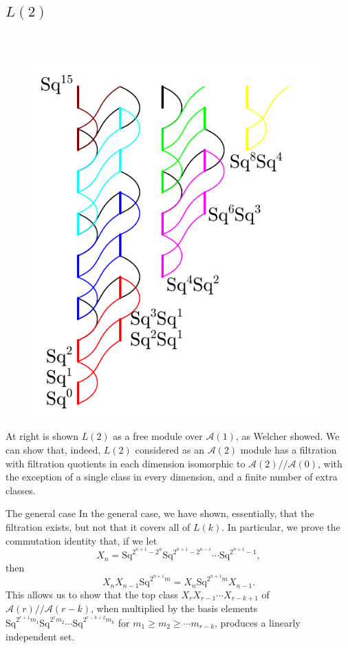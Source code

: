 \documentclass[final]{beamer}
\newcommand{\A}{\mathcal{A}}
\newcommand{\Sq}{\mathrm{Sq}}
\newcommand{\mm}{/\!/\!}
\begin{document}
\begin{columns}[T]
\begin{column}{0.245\textwidth}
      \subsection{$L(2)$}\\
      \begin{figure}
        \begin{center}
          \vspace{-1em}
          \includegraphics[scale=2]{pics/L2-1.pdf}
          \vspace{-1em}
        \end{center}
      \end{figure}
      At right is shown $L(2)$ as a free module over $\A(1)$, as Welcher showed.  We can show that, indeed, $L(2)$ considered as an $\A(2)$ module has a filtration with filtration quotients in each dimension isomorphic to $\A(2)\mm\A(0)$, with the exception of a single class in every dimension, and a finite number of extra classes.

      \begin{block}{The general case}
        In the general case, we have shown, essentially, that the filtration exists, but not that it covers all of $L(k)$.  In particular, we prove the commutation identity that, if we let
        \[X_n = \Sq^{2^{n+1}-2^n}\Sq^{2^{n+1}-2^{n-1}}\cdots\Sq^{2^{n+1}-1},\]
        then
        \[X_nX_{n-1}\Sq^{2^{n+1}m} = X_n\Sq^{2^{n+1}m}X_{n-1}.\]
        This allows us to show that the top class $X_rX_{r-1}\cdots X_{r-k+1}$ of $\A(r)\mm\A(r-k)$, when multiplied by the basis elements $\Sq^{2^{r+1}m_1}\Sq^{2^rm_2}\cdots\Sq^{2^{r-k+2}m_k}$ for $m_1\geq m_2\geq\cdots m_{r-k}$, produces a linearly independent set.


\end{block}
\end{column}
\end{columns}
\end{document}

